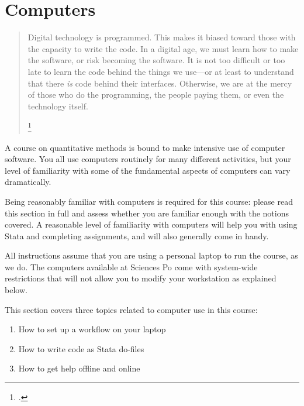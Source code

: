 %
%

\chapter{Computers}%
  \label{ch:computers}%

\begin{quote}%
  Digital technology is programmed. This makes it biased toward those with the capacity to write the code. In a digital age, we must learn how to make the software, or risk becoming the software. It is not too difficult or too late to learn the code behind the things we use—or at least to understand that there \emph{is} code behind their interfaces. Otherwise, we are at the mercy of those who do the programming, the people paying them, or even the technology itself.%
  
  \footcite[128]{Rushkof2010}
\end{quote}

A course on quantitative methods is bound to make intensive use of computer software. You all use computers routinely for many different activities, but your level of familiarity with some of the fundamental aspects of computers can vary dramatically.

Being reasonably familiar with computers is required for this course: please read this section in full and assess whether you are familiar enough with the notions covered. A reasonable level of familiarity with computers will help you with using Stata and completing assignments, and will also generally come in handy.

All instructions assume that you are using a personal laptop to run the course, as we do. The computers available at Sciences Po come with system-wide restrictions that will not allow you to modify your workstation as explained below.

This section covers three topics related to computer use in this course:

\begin{enumerate}
	\item How to set up a workflow on your laptop
	\item How to write code as Stata do-files
	\item How to get help offline and online
\end{enumerate}




